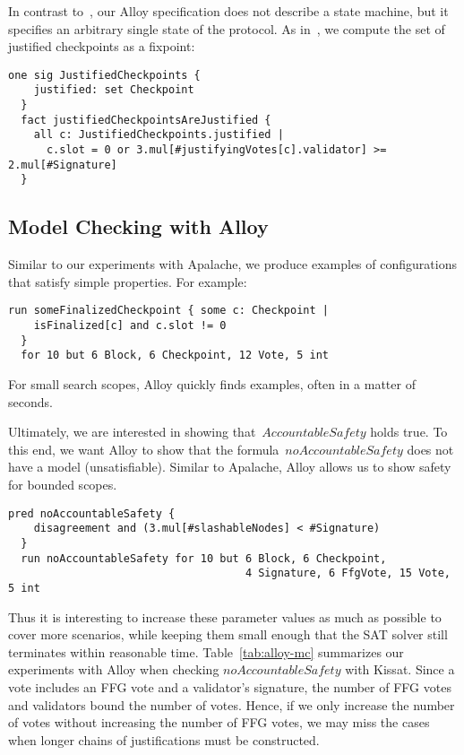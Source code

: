 In contrast to~\SpecThree{}, our Alloy specification does not describe a
state machine, but it specifies an arbitrary single state of the protocol. As
in~\SpecThree{}, we compute the set of justified checkpoints as a fixpoint:

\begin{lstlisting}[language=alloy,columns=fullflexible]
  one sig JustifiedCheckpoints {
    justified: set Checkpoint
  }
  fact justifiedCheckpointsAreJustified {
    all c: JustifiedCheckpoints.justified |
      c.slot = 0 or 3.mul[#justifyingVotes[c].validator] >= 2.mul[#Signature]
  }
\end{lstlisting}

\subsection{Model Checking with Alloy}

Similar to our experiments with Apalache, we produce examples of configurations
that satisfy simple properties. For example:

\begin{lstlisting}[language=alloy,columns=fullflexible]
  run someFinalizedCheckpoint { some c: Checkpoint |
    isFinalized[c] and c.slot != 0
  }
  for 10 but 6 Block, 6 Checkpoint, 12 Vote, 5 int
\end{lstlisting}

For small search scopes, Alloy quickly finds examples, often in a matter
of seconds.

Ultimately, we are interested in showing that~$\textit{AccountableSafety}$
holds true. To this end, we want Alloy to show that the
formula~$\textit{noAccountableSafety}$ does not have a model (unsatisfiable).
Similar to Apalache, Alloy allows us to show safety for bounded scopes.

\begin{lstlisting}[language=alloy,columns=fullflexible]
  pred noAccountableSafety {
    disagreement and (3.mul[#slashableNodes] < #Signature)
  }
  run noAccountableSafety for 10 but 6 Block, 6 Checkpoint,
                                     4 Signature, 6 FfgVote, 15 Vote, 5 int
\end{lstlisting}

Thus it is interesting to increase these parameter values as much as possible
to cover more scenarios, while keeping them small enough that the SAT solver
still terminates within reasonable time. Table~\ref{tab:alloy-mc} summarizes
our experiments with Alloy when checking $\textit{noAccountableSafety}$ with
Kissat.  Since a vote includes an FFG vote and a validator's signature, the
number of FFG votes and validators bound the number of votes. Hence, if we only
increase the number of votes without increasing the number of FFG votes, we may
miss the cases when longer chains of justifications must be constructed.


